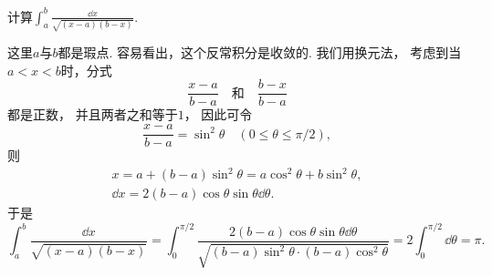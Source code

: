 \begin{example}
计算\(\int_a^b \frac{\dd{x}}{\sqrt{(x-a)(b-x)}}\).
\begin{solution}
这里\(a\)与\(b\)都是瑕点.
容易看出，这个反常积分是收敛的.
我们用换元法，
考虑到当\(a<x<b\)时，分式\begin{equation*}
	\frac{x-a}{b-a}
	\quad\text{和}\quad
	\frac{b-x}{b-a}
\end{equation*}都是正数，
并且两者之和等于\(1\)，
因此可令\begin{equation*}
	\frac{x-a}{b-a} = \sin^2\theta
	\quad(0\leq\theta\leq\pi/2),
\end{equation*}
则\begin{gather*}
	x = a + (b-a) \sin^2\theta
	= a \cos^2\theta + b \sin^2\theta, \\
	\dd{x} = 2(b-a) \cos\theta \sin\theta \dd{\theta}.
\end{gather*}
于是\begin{equation*}
	\int_a^b \frac{\dd{x}}{\sqrt{(x-a)(b-x)}}
	= \int_0^{\pi/2} \frac{2(b-a) \cos\theta \sin\theta \dd{\theta}}
		{\sqrt{(b-a) \sin^2\theta \cdot (b-a) \cos^2\theta}}
	= 2 \int_0^{\pi/2} \dd{\theta}
	= \pi.
\end{equation*}
\end{solution}
\end{example}

